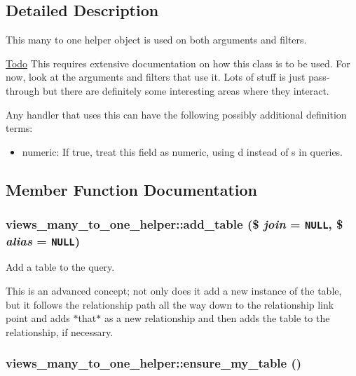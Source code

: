 \subsection{Detailed Description}
This many to one helper object is used on both arguments and filters.

\begin{Desc}
\item[\hyperlink{todo__todo000008}{Todo}]This requires extensive documentation on how this class is to be used. For now, look at the arguments and filters that use it. Lots of stuff is just pass-through but there are definitely some interesting areas where they interact.\end{Desc}
Any handler that uses this can have the following possibly additional definition terms:\begin{itemize}
\item numeric: If true, treat this field as numeric, using d instead of s in queries. \end{itemize}


\subsection{Member Function Documentation}
\hypertarget{classviews__many__to__one__helper_0d8f88cfcc6bbb792c0fd0b3e1f42882}{
\subsubsection[{add\_\-table}]{\setlength{\rightskip}{0pt plus 5cm}views\_\-many\_\-to\_\-one\_\-helper::add\_\-table (\$ {\em join} = {\tt NULL}, \/  \$ {\em alias} = {\tt NULL})}}
\label{classviews__many__to__one__helper_0d8f88cfcc6bbb792c0fd0b3e1f42882}


Add a table to the query.

This is an advanced concept; not only does it add a new instance of the table, but it follows the relationship path all the way down to the relationship link point and adds $\ast$that$\ast$ as a new relationship and then adds the table to the relationship, if necessary. \hypertarget{classviews__many__to__one__helper_5fdd8b532ced88b77fdd90fdb69e1ced}{
\subsubsection[{ensure\_\-my\_\-table}]{\setlength{\rightskip}{0pt plus 5cm}views\_\-many\_\-to\_\-one\_\-helper::ensure\_\-my\_\-table ()}}
\label{classviews__many__to__one__helper_5fdd8b532ced88b77fdd90fdb69e1ced}


